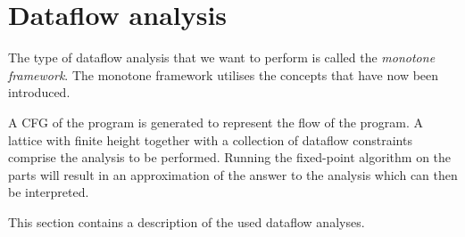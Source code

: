 \section{Dataflow analysis}
The type of dataflow analysis that we want to perform is called the \emph{monotone framework}.
The monotone framework utilises the concepts that have now been introduced.

A CFG of the program is generated to represent the flow of the program.
A lattice with finite height together with a collection of dataflow constraints comprise the analysis to be performed.
Running the fixed-point algorithm on the parts will result in an approximation of the answer to the analysis which can then be interpreted.

This section contains a description of the used dataflow analyses. 
